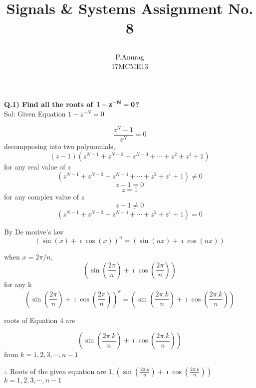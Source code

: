 \documentclass[a4paper,10pt]{article}
\title{
  \begin{large}
    Signals \& Systems
    Assignment No. 8
  \end{large}
}
\author{P.Anurag\\ 17MCME13}
\begin{document}
\maketitle
  \begin{flushleft}
    \large{\bf{Q.1) Find all the roots of $\bf{1-z^{-N} = 0}$?}}\\
    Sol: Given Equation $1-z^{-N} = 0$
  \end{flushleft}
  \begin{equation}
    \frac{z^N - 1}{z^N} = 0
  \end{equation}
  decompposing into two polynomials,
  \begin{equation}
    (z-1)(z^{N-1} + z^{N-2} + z^{N-3} + \cdots + z^2 + z^1 + 1)
  \end{equation}
  for any real value of $z$ 
  \[
    (z^{N-1} + z^{N-2} + z^{N-3} + \cdots + z^2 + z^1 + 1) \neq 0
  \]
  \[
    z - 1 = 0
  \]
  \begin{equation}
    z = 1
  \end{equation}
  for any complex value of $z$
  \[
    z - 1 \neq 0
  \]
  \begin{equation}
    (z^{N-1} + z^{N-2} + z^{N-3} + \cdots + z^2 + z^1 + 1) = 0
  \end{equation}
  
  By De morive's law 
  \[
    \left(
      \sin(x) + \imath\cos(x)
    \right)^n = (\sin(nx) + \imath\cos(nx))
  \]

  when $x = 2\pi/n$,
  \[
    \left(
      \sin(\frac{2\pi}{n}) + \imath\cos(\frac{2\pi}{n})
    \right)
  \]
  for any k
  \[
    \left(
      \sin(\frac{2\pi}{n}) + \imath\cos(\frac{2\pi}{n})
    \right)^k = (\sin(\frac{2\pi.k}{n}) + \imath\cos(\frac{2\pi.k}{n}))
  \]
  
  \begin{flushleft}
    roots of Equation 4 are
  \end{flushleft}
  \[
    (\sin(\frac{2\pi.k}{n}) + \imath\cos(\frac{2\pi.k}{n}))
  \]
  from $k = 1, 2, 3, \cdots , n-1$

  $\therefore$ Roots of the given equation are $1, (\sin(\frac{2\pi.k}{n}) + \imath\cos(\frac{2\pi.k}{n}))$\\
  $k = 1, 2, 3, \cdots , n-1$
\end{document}
